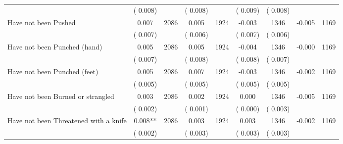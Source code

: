 \begin{tabular}{l*{8}{c}}
                       &       (       0.008)            &                               &       (       0.008)            &                               &       (       0.009)            &       (       0.008) &                  \\
Have not been Pushed        &              0.007      &       2086       &              0.005      &       1924       &             -0.003      &       1346  &       -0.005 &       1169       \\
                       &       (       0.007)            &                               &       (       0.006)            &                               &       (       0.007)            &       (       0.006) &                  \\
Have not been Punched (hand)        &              0.005      &       2086       &              0.005      &       1924       &             -0.004      &       1346  &       -0.000 &       1169       \\
                       &       (       0.007)            &                               &       (       0.008)            &                               &       (       0.008)            &       (       0.007) &                  \\
Have not been Punched (feet)        &              0.005      &       2086       &              0.007      &       1924       &             -0.003      &       1346  &       -0.002 &       1169       \\
                       &       (       0.005)            &                               &       (       0.005)            &                               &       (       0.005)            &       (       0.005) &                  \\
Have not been Burned or strangled        &              0.003      &       2086       &              0.002      &       1924       &              0.000      &       1346  &       -0.005 &       1169       \\
                       &       (       0.002)            &                               &       (       0.001)            &                               &       (       0.000)            &       (       0.003) &                  \\
Have not been Threatened with a knife        &              0.008**      &       2086       &              0.003      &       1924       &              0.003      &       1346  &       -0.002 &       1169       \\
                       &       (       0.002)            &                               &       (       0.003)            &                               &       (       0.003)            &       (       0.003) &                  \\

\end{tabular}
